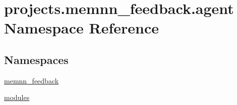 \hypertarget{namespaceprojects_1_1memnn__feedback_1_1agent}{}\section{projects.\+memnn\+\_\+feedback.\+agent Namespace Reference}
\label{namespaceprojects_1_1memnn__feedback_1_1agent}
\subsection*{Namespaces}
\begin{DoxyCompactItemize}
\item 
 \hyperlink{namespaceprojects_1_1memnn__feedback_1_1agent_1_1memnn__feedback}{memnn\+\_\+feedback}
\item 
 \hyperlink{namespaceprojects_1_1memnn__feedback_1_1agent_1_1modules}{modules}
\end{DoxyCompactItemize}
